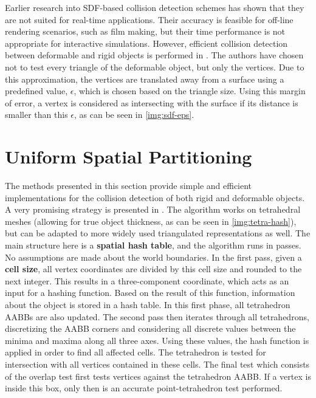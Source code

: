 Earlier research into SDF-based collision detection schemes has shown that they are not suited for real-time applications. Their accuracy is feasible for off-line rendering scenarios, such as film making, but their time performance is not appropriate for interactive simulations. However, efficient collision detection between deformable and rigid objects is performed in \citep{fsg03}. The authors have chosen not to test every triangle of the deformable object, but only the vertices. Due to this approximation, the vertices are translated away from a surface using a predefined value, $\epsilon$, which is chosen based on the triangle size. Using this margin of error, a vertex is considered as intersecting with the surface if its distance is smaller than this $\epsilon$, as can be seen in \autoref{img:sdf-eps}.

\FloatBarrier



\section{Uniform Spatial Partitioning}
\label{sec:usp}



The methods presented in this section provide simple and efficient implementations for the collision detection of both rigid and deformable objects. A very promising strategy is presented in \citep{thm03}. The algorithm works on tetrahedral meshes (allowing for true object thickness, as can be seen in \autoref{img:tetra-hash}), but can be adapted to more widely used triangulated representations as well. The main structure here is a \textbf{spatial hash table}, and the algorithm runs in passes. No assumptions are made about the world boundaries. In the first pass, given a \textbf{cell size}, all vertex coordinates are divided by this cell size and rounded to the next integer. This results in a three-component coordinate, which acts as an input for a hashing function. Based on the result of this function, information about the object is stored in a hash table. In this first phase, all tetrahedron AABBs are also updated. The second pass then iterates through all tetrahedrons, discretizing the AABB corners and considering all discrete values between the minima and maxima along all three axes. Using these values, the hash function is applied in order to find all affected cells. The tetrahedron is tested for intersection with all vertices contained in these cells. The final test which consists of the overlap test first tests vertices against the tetrahedron AABB. If a vertex is inside this box, only then is an accurate point-tetrahedron test performed.

